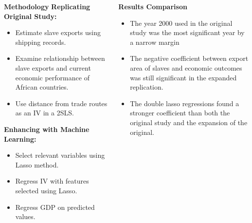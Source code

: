 \documentclass[final]{beamer}
\begin{document}
\begin{frame}[t]
\begin{columns}[T]
\begin{column}{.32\textwidth}
    \vspace{0.3cm} %

    
    \begin{block}{\Large \textbf{Methodology}} %
    \Large %
  \textbf{  Replicating Original Study:}
    \begin{itemize}
        \item Estimate slave exports using shipping records.
        \item Examine relationship between slave exports and current economic performance of African countries.
        \item Use distance from trade routes as an IV in a 2SLS.
    \end{itemize}

        \vspace{0.5cm} %
\textbf{    Enhancing with Machine Learning:}
    \begin{itemize}
        
        \item Select relevant variables using Lasso method.
        \item Regress IV with features selected using Lasso.
        \item Regress GDP on predicted values.
 \end{itemize}
    \end{block}

\end{column}

\begin{column}{.32\textwidth}

    \vspace{0.1cm} %

    \begin{block}{\Large \textbf{Results Comparison}} %
    \Large %
    \begin{itemize}
     \item The year 2000 used in the original study was the most significant year by a narrow margin
     \item The negative coefficient between export area of slaves and economic outcomes was still significant in the expanded replication.
  \item The double lasso regressions found a stronger coefficient than both the original study and the expansion of the original. 
    \end{itemize}


\end{block}
\end{column}
\end{columns}
\end{frame}
\end{document}
